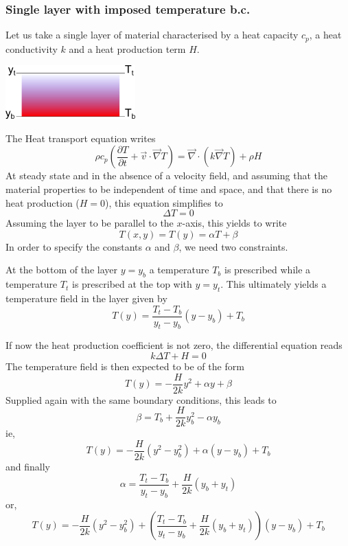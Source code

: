 \subsubsection{Single layer with imposed temperature b.c.}

Let us take a single layer of material characterised by
a heat capacity $c_p$, a heat conductivity $k$
and a heat production term $H$.

\begin{center}
\includegraphics[width=5cm]{images/initial_temperature/tempcond.png}
\end{center}

The Heat transport equation writes
\[
\rho c_p ( \frac{\partial T}{\partial t} + {\vec v} \cdot {\vec \nabla} { T}) = 
{\vec \nabla} \cdot (k {\vec \nabla} T) + \rho H
\]
At steady state and in the absence of a velocity field, and assuming
that the material properties to be independent of time and space, and that
there is no heat production ($H=0$), this equation
simplifies to
\[
\Delta T =0 
\]
Assuming the layer to be parallel to the $x$-axis, this yields to write
\[
T(x,y)=T(y)=\alpha T+ \beta
\]
In order to specify the constants $\alpha$ and $\beta$, we need two constraints.

At the bottom of the layer $y=y_b$ a temperature $T_b$ is prescribed while a temperature
$T_t$ is prescribed at the top with $y=y_t$. This ultimately yields a temperature field in
the layer given by
\[
\boxed{
T(y) = \frac{T_t-T_b}{y_t-y_b}(y-y_b) + T_b
}
\]

If now the heat production coefficient is not zero, the differential equation
reads
\[
 k \Delta T + H = 0 
\]
The temperature field is then expected to be of the form
\[
T(y)= - \frac{H}{2k} y^2 + \alpha y + \beta 
\]
Supplied again with the same boundary conditions, this leads to
\[
\beta=T_b + \frac{H}{2k} y_b^2 - \alpha y_b
\]
ie,
\[
T(y) = -\frac{H}{2k} (y^2-y_b^2) + \alpha (y-y_b) + T_b
\]
and finally
\[
\alpha =  \frac{T_t-T_b}{y_t-y_b}  + \frac{H}{2k}(y_b+y_t)
\]
or,
\[
T(y) = -\frac{H}{2k} (y^2-y_b^2) + \left( \frac{T_t-T_b}{y_t-y_b}  + \frac{H}{2k}(y_b+y_t)   \right) (y-y_b) + T_b
\]

